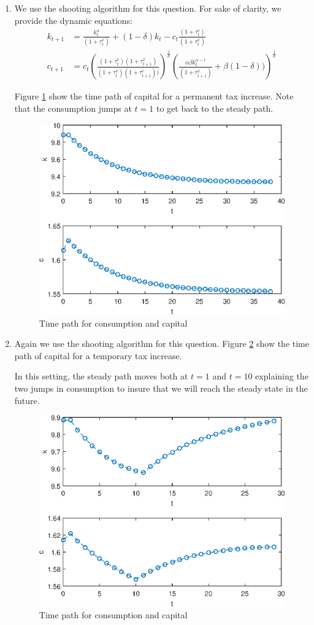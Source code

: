 \documentclass[12pt]{article}
\newcommand{\1}{{\bf 1}} %
\begin{document}
\begin{enumerate}[(1)]
	\item
	
	We use the shooting algorithm for this question. For sake of clarity, we provide the dynamic equations:
	\begin{align*}
		k_{t+1} &= \frac{k_t^\alpha}{(1+\tau^x_t)}+(1-\delta)k_t-c_t\frac{(1+\tau^c_t)}{(1+\tau^x_t)}\\
		c_{t+1} &= c_t\left( \frac{(1+\tau^c_t)(1+\tau^x_{t+1})}{(1+\tau^x_t)(1+\tau^c_{t+1}))}\right)^\frac{1}{\sigma}\left( \frac{\alpha\beta k_t^{\alpha-1}}{(1+\tau^x_{t+1})}+\beta(1-\delta))\right) ^\frac{1}{\sigma}
	\end{align*}
	
	
	Figure \ref{fig:fig4} show the time path of capital for a permanent tax increase. Note that the consumption jumps at $t=1$ to get back to the steady path.
	\begin{figure}[H]
		\centering
		\includegraphics[width=0.7\linewidth]{fig4}
		\caption{Time path for consumption and capital}
		\label{fig:fig4}
	\end{figure}

	\item
	
	Again we use the shooting algorithm for this question. Figure \ref{fig:fig5} show the time path of capital for a temporary tax increase. 
	
	In this setting, the steady path moves both at $t=1$ and $t=10$ explaining the two jumps in consumption to insure that we will reach the steady state in the future. 
	\begin{figure}[H]
		\centering
		\includegraphics[width=0.7\linewidth]{fig5}
		\caption{Time path for consumption and capital}
		\label{fig:fig5}
	\end{figure}


\end{enumerate}
\end{document}

